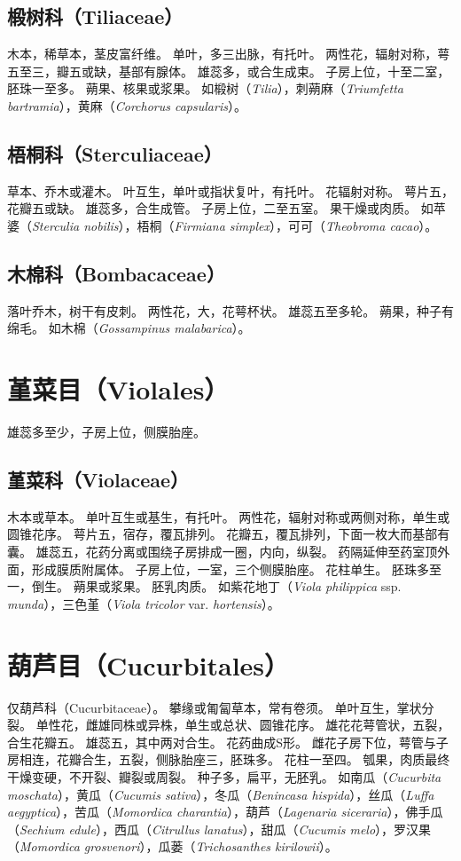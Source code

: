 \documentclass[11pt]{article}
\begin{document}
\begin{sloppypar}
\subsection{椴树科（Tiliaceae）}
木本，稀草本，茎皮富纤维。
单叶，多三出脉，有托叶。
两性花，辐射对称，萼五至三，瓣五或缺，基部有腺体。
雄蕊多，或合生成束。
子房上位，十至二室，胚珠一至多。
蒴果、核果或浆果。
如椴树（\textit{Tilia}），刺蒴麻（\textit{Triumfetta bartramia}），黄麻（\textit{Corchorus capsularis}）。

\subsection{梧桐科（Sterculiaceae）}
草本、乔木或灌木。
叶互生，单叶或指状复叶，有托叶。
花辐射对称。
萼片五，花瓣五或缺。
雄蕊多，合生成管。
子房上位，二至五室。
果干燥或肉质。
如苹婆（\textit{Sterculia nobilis}），梧桐（\textit{Firmiana simplex}），可可（\textit{Theobroma cacao}）。

\subsection{木棉科（Bombacaceae）}
落叶乔木，树干有皮刺。
两性花，大，花萼杯状。
雄蕊五至多轮。
蒴果，种子有绵毛。
如木棉（\textit{Gossampinus malabarica}）。

\section{堇菜目（Violales）}
雄蕊多至少，子房上位，侧膜胎座。

\subsection{堇菜科（Violaceae）}
木本或草本。
单叶互生或基生，有托叶。
两性花，辐射对称或两侧对称，单生或圆锥花序。
萼片五，宿存，覆瓦排列。
花瓣五，覆瓦排列，下面一枚大而基部有囊。
雄蕊五，花药分离或围绕子房排成一圈，内向，纵裂。
药隔延伸至药室顶外面，形成膜质附属体。
子房上位，一室，三个侧膜胎座。
花柱单生。
胚珠多至一，倒生。
蒴果或浆果。
胚乳肉质。
如紫花地丁（\textit{Viola philippica} ssp. \textit{munda}），三色堇（\textit{Viola tricolor} var. \textit{hortensis}）。

\section{葫芦目（Cucurbitales）}
仅葫芦科（Cucurbitaceae）。
攀缘或匍匐草本，常有卷须。
单叶互生，掌状分裂。
单性花，雌雄同株或异株，单生或总状、圆锥花序。
雄花花萼管状，五裂，合生花瓣五。
雄蕊五，其中两对合生。
花药曲成S形。
雌花子房下位，萼管与子房相连，花瓣合生，五裂，侧脉胎座三，胚珠多。
花柱一至四。
瓠果，肉质最终干燥变硬，不开裂、瓣裂或周裂。
种子多，扁平，无胚乳。
如南瓜（\textit{Cucurbita moschata}），黄瓜（\textit{Cucumis sativa}），冬瓜（\textit{Benincasa hispida}），丝瓜（\textit{Luffa aegyptica}），苦瓜（\textit{Momordica charantia}），葫芦（\textit{Lagenaria siceraria}），佛手瓜（\textit{Sechium edule}），西瓜（\textit{Citrullus lanatus}），甜瓜（\textit{Cucumis melo}），罗汉果（\textit{Momordica grosvenori}），瓜蒌（\textit{Trichosanthes kirilowii}）。


\end{sloppypar}
\end{document}
